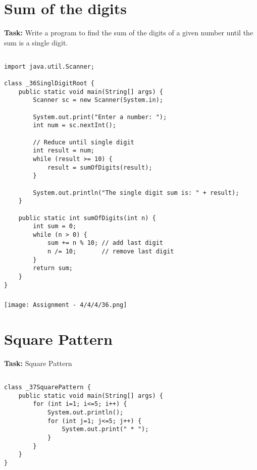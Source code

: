 \documentclass[12pt,a4paper]{article}
\begin{document}

\section{Sum of the digits}
\textbf{Task:} Write a program to find the sum of the digits of a given number until the sum is a single digit.

\subsection{}
\begin{lstlisting}
import java.util.Scanner;

class _36SinglDigitRoot {
    public static void main(String[] args) {
        Scanner sc = new Scanner(System.in);
    
        System.out.print("Enter a number: ");
        int num = sc.nextInt();
    
        // Reduce until single digit
        int result = num;
        while (result >= 10) {
            result = sumOfDigits(result);
        }
    
        System.out.println("The single digit sum is: " + result);
    }
    
    public static int sumOfDigits(int n) {
        int sum = 0;
        while (n > 0) {
            sum += n % 10; // add last digit
            n /= 10;       // remove last digit
        }
        return sum;
    }
}
\end{lstlisting}

\subsubsection{}
\begin{center}
    \texttt{[image: Assignment - 4/4/4/36.png]}
\end{center}


\section{Square Pattern}
\textbf{Task:} Square Pattern

\subsection{}
\begin{lstlisting}
class _37SquarePattern {
    public static void main(String[] args) {
        for (int i=1; i<=5; i++) {
            System.out.println();
            for (int j=1; j<=5; j++) {
                System.out.print(" * ");
            }
        }
    }
}
\end{lstlisting}
\end{document}
